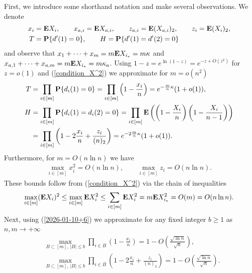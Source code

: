 \documentclass[11pt, a4paper]{article}
\newcommand{\E}{{\bf{E}}}
\newcommand{\PP}{{\bf{P}}}
\begin{document}
First, we introduce some shorthand notation and make several observations.
We denote
\begin{align*}
x_i
&
=
\E X_i,
\qquad
x_{a,i}
=
\E X_{a,i},
\qquad
z_{a,i}=\E(X_{a,i})_2,
\qquad
z_i=\E(X_i)_2,
\\
T
&
=
\PP\{d'(1)=0\},
\qquad
H
=
\PP\{d'(1)=d'(2)=0\}
\end{align*}
and observe that $x_1+\cdots+x_m=m\E X_{i_*}=m\kappa$ and
$x_{a,1}+\cdots+x_{a,m}=m\E X_{i_*}=m\kappa_a$. 
Using
$1-z=e^{\ln(1-z)}=e^{-z+O(z^2)}$ for $z=o(1)$ and  (\ref{condition_X^2})  we approximate
for $m=o(n^2)$
\begin{align}
\label{T}
T
&
=
\prod_{i\in[m]}
\PP\{d_i(1)=0\}
=
\prod_{i\in[m]}
\left(1-\frac{x_i}{n}\right)
=
e^{-\frac{m}{n}\kappa}(1+o(1)),
\\
\nonumber
H
&
=
\prod_{i\in[m]}
\PP\{d_i(1)=d_i(2)=0\}
=
\prod_{i\in[m]}
\E
\left(
\left(1-\frac{X_i}{n}\right)
\left(1-\frac{X_i}{n-1}\right)
\right)
\\
\label{H}
&
=
\prod_{i\in[m]}
\left(
1-2\frac{x_i}{n}+\frac{z_i}{(n)_2}\right)
=
e^{-2\frac{m}{n}\kappa}(1+o(1)).
\end{align}
Furthermore,  for $m=O(n\ln n)$  we have 
\begin{align}
\label{2026-01-10+6}
\max_{i\in [m]}x_i^2=O(n\ln n),
\qquad 
\max_{i\in [m]}z_i=O(n\ln n).
\end{align}
These bounds follow from  (\ref{condition_X^2}) via the chain of inequalities
\begin{align*}
\max_{i\in[m]} (\E X_i)^2
\le 
\max_{i\in[m]} \E X_i^2
\le 
\sum_{i\in [m]}\E X_{i}^2
=
m\E X_{i_*}^2 =O(m)=O(n\ln n).
\end{align*}
Next, using  (\ref{2026-01-10+6}) 
we approximate
 for any fixed integer  $b\ge 1$ 
as $n,m\to+\infty$
\begin{align}
\label{2026-01-10+1}
&
\max_{B\subset [m],\, |B|\le b} \prod_{i\in B}\left(1-\frac{x_i}{n}\right)
=
1-O\left(\frac{\sqrt{\ln n}}{\sqrt{n}}\right),
\\
\label{2026-01-10+2}
&
\max_{B\subset [m],\, |B|\le b} \prod_{i\in B}\left(1-2\frac{x_i}{n}+\frac{z_i}{(n)_2}\right)
=
1-O\left(\frac{\sqrt{\ln n}}{\sqrt{n}}\right).
\end{align}
\end{document}
